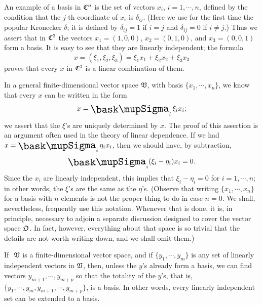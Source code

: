 An example of a basis in \(\frak{C}^n\) is the set of vectors \(x_i\), \(i = 1,
\cdots, n\), defined by the condition that the \(j\)-th coordinate of \(x_i\) is
\(\delta_{ij}\). (Here we use for the first time the popular Kronecker
\(\delta\); it is defined by \(\delta_{ij} = 1\) if \(i = j\) and \(\delta_{ij}
= 0\) if \(i \neq j\).) Thus we assert that in \(\frak{C}^3\) the vectors \(x_1
= (1,0,0)\), \(x_2 = (0,1,0)\), and \(x_3 = (0,0,1)\) form a basis. It is easy
to see that they are linearly independent; the formula
\begin{equation*}
    x = (\xi_1, \xi_2, \xi_3) = \xi_1 x_1 + \xi_2 x_2 + \xi_3 x_3
\end{equation*}
proves that every \(x\) in \(\frak{C}^3\) is a linear combination of them.

In a general finite-dimensional vector space \(  \frak{V}\), with basis
\(\{x_1,\cdots,x_n\}\), we know that every \(x\) can be written in the form
\begin{equation*}
    \textstyle x = \sumx_i \xi_i x_i;
\end{equation*}
we assert that the \(\xi\)'s are uniquely determined by \(x\). The proof of this
assertion is an argument often used in the theory of linear dependence. If we
had \(x = \sumx_i \eta_i x_i\), then we should have, by subtraction,
\begin{equation*}
    \textstyle \sumx_i (\xi_i - \eta_i) x_i = 0.
\end{equation*}
Since the \(x_i\) are linearly independent, this implies that \(\xi_i - \eta_i =
0\) for \(i = 1, \cdots , n\); in other words, the \(\xi\)'s are the same as the
\(\eta\)'s. (Observe that writing \(\{x_1,\cdots,x_n\}\) for a basis with \(n\)
elements is not the proper thing to do in case \(n = 0\). We shall,
nevertheless, frequently use this notation. Whenever that is done, it is, in
principle, necessary to adjoin a separate discussion designed to cover the
vector space \(\frak{O}\). In fact, however, everything about that space is so
trivial that the details are not worth writing down, and we shall omit them.)

\begin{theorem}
    If \(~\frak{V}\) is a finite-dimensional vector space, and if \(\{y_1, \cdots,
    y_m\}\) is any set of linearly independent vectors in \(\frak{V}\), then,
    unless the \(y\)'s already form a basis, we can find vectors \(y_{m+1},
    \cdots, y_{m+p}\) so that the totality of the \(y\)'s, that is, \(\{y_1,
    \cdots, y_m, y_{m+1}, \cdots, y_{m+p}\}\), is a basis. In other words, every
    linearly independent set can be extended to a basis.
\end{theorem}

